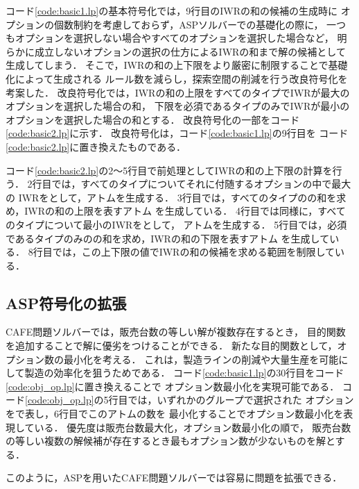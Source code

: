 コード\ref{code:basic1.lp}の基本符号化では，9行目のIWRの和の候補の生成時に
オプションの個数制約を考慮しておらず，ASPソルバーでの基礎化の際に，
一つもオプションを選択しない場合やすべてのオプションを選択した場合など，
明らかに成立しないオプションの選択の仕方によるIWRの和まで解の候補として生成してしまう．
そこで，IWRの和の上下限をより厳密に制限することで基礎化によって生成される
ルール数を減らし，探索空間の削減を行う改良符号化を考案した．
改良符号化では，IWRの和の上限をすべてのタイプでIWRが最大のオプションを選択した場合の和，
下限を必須であるタイプのみでIWRが最小のオプションを選択した場合の和とする．
改良符号化の一部をコード\ref{code:basic2.lp}に示す．
改良符号化は，コード\ref{code:basic1.lp}の9行目を
コード\ref{code:basic2.lp}に置き換えたものである．

コード\ref{code:basic2.lp}の2〜5行目で前処理としてIWRの和の上下限の計算を行う．
2行目では，すべてのタイプについてそれに付随するオプションの中で最大の
IWRをとして，アトムを生成する．
3行目では，すべてのタイプのの和を求め，IWRの和の上限を表すアトム
を生成している．
4行目では同様に，すべてのタイプについて最小のIWRをとして，
アトムを生成する．
5行目では，必須であるタイプのみのの和を求め，IWRの和の下限を表すアトム
を生成している．
8行目では，この上下限の値でIWRの和の候補を求める範囲を制限している．

\subsection{ASP符号化の拡張}
CAFE問題ソルバーでは，販売台数の等しい解が複数存在するとき，
目的関数を追加することで解に優劣をつけることができる．
新たな目的関数として，オプション数の最小化を考える．
これは，製造ラインの削減や大量生産を可能にして製造の効率化を狙うためである．
コード\ref{code:basic1.lp}の30行目をコード\ref{code:obj_op.lp}に置き換えることで
オプション数最小化を実現可能である．
コード\ref{code:obj_op.lp}の5行目では，いずれかのグループで選択された
オプションをで表し，6行目でこのアトムの数を
最小化することでオプション数最小化を表現している．
優先度は販売台数最大化，オプション数最小化の順で，
販売台数の等しい複数の解候補が存在するとき最もオプション数が少ないものを解とする．

このように，ASPを用いたCAFE問題ソルバーでは容易に問題を拡張できる．

 
